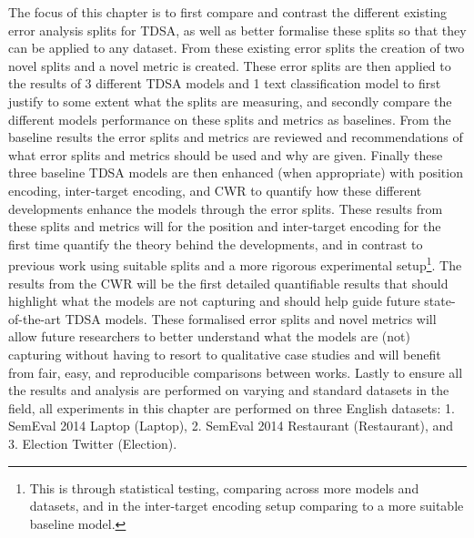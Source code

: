 The focus of this chapter is to first compare and contrast the different existing error analysis splits for TDSA, as well as better formalise these splits so that they can be applied to any dataset. From these existing error splits the creation of two novel splits and a novel metric is created. These error splits are then applied to the results of 3 different TDSA models and 1 text classification model to first justify to some extent what the splits are measuring, and secondly compare the different models performance on these splits and metrics as baselines. From the baseline results the error splits and metrics are reviewed and recommendations of what error splits and metrics should be used and why are given. Finally these three baseline TDSA models are then enhanced (when appropriate) with position encoding, inter-target encoding, and CWR to quantify how these different developments enhance the models through the error splits. These results from these splits and metrics will for the position and inter-target encoding for the first time quantify the theory behind the developments, and in contrast to previous work using suitable splits and a more rigorous experimental setup\footnote{This is through statistical testing, comparing across more models and datasets, and in the inter-target encoding setup comparing to a more suitable baseline model.}. The results from the CWR will be the first detailed quantifiable results that should highlight what the models are not capturing and should help guide future state-of-the-art TDSA models. These formalised error splits and novel metrics will allow future researchers to better understand what the models are (not) capturing without having to resort to qualitative case studies and will benefit from fair, easy, and reproducible comparisons between works. Lastly to ensure all the results and analysis are performed on varying and standard datasets in the field, all experiments in this chapter are performed on three English datasets: 1. SemEval 2014 Laptop \citep{aug_pontiki-etal-2014-semeval} (Laptop), 2. SemEval 2014 Restaurant \citep{aug_pontiki-etal-2014-semeval} (Restaurant), and 3. Election Twitter \citep{aug_wang_2017} (Election). 


